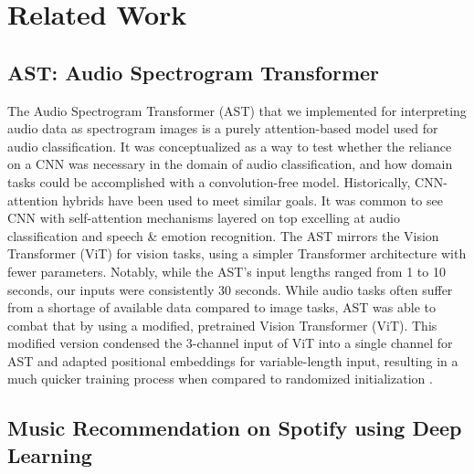 \section{Related Work}
\label{sec:formatting}

\subsection{AST: Audio Spectrogram Transformer}

The Audio Spectrogram Transformer (AST) that we implemented for interpreting audio data as spectrogram images is a purely attention-based model used for audio classification. It was conceptualized as a way to test whether the reliance on a CNN was necessary in the domain of audio classification, and how domain tasks could be accomplished with a convolution-free model. Historically, CNN-attention hybrids have been used to meet similar goals. It was common to see CNN with self-attention mechanisms layered on top excelling at audio classification and speech \& emotion recognition. The AST mirrors the Vision Transformer (ViT) for vision tasks, using a simpler Transformer architecture with fewer parameters. Notably, while the AST’s input lengths ranged from 1 to 10 seconds, our inputs were consistently 30 seconds. While audio tasks often suffer from a shortage of available data compared to image tasks, AST was able to combat that by using a modified, pretrained Vision Transformer (ViT). This modified version condensed the 3-channel input of ViT into a single channel for AST and adapted positional embeddings for variable-length input, resulting in a much quicker training process when compared to randomized initialization \cite{AST}.

\subsection{Music Recommendation on Spotify using Deep Learning}

